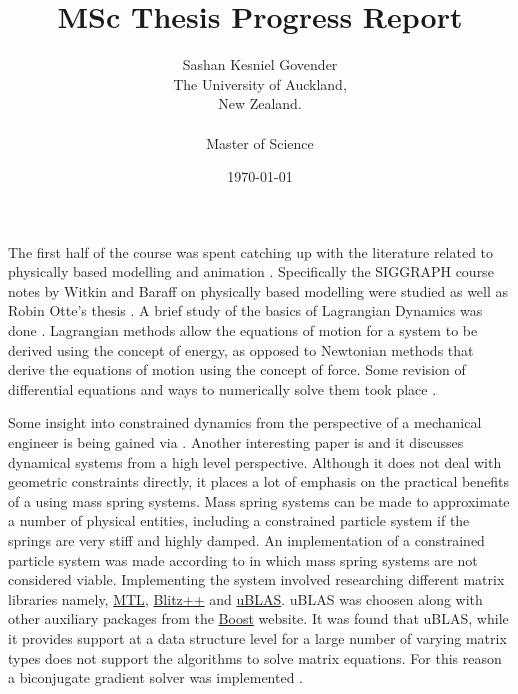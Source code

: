 \documentclass[12pt]{report}
\begin{document}
\title{MSc Thesis Progress Report}
\date{\today}
\author{Sashan Kesniel Govender\\
The University of Auckland, \\
New Zealand.\\
\\
Master of Science} 
\maketitle
\newpage
The first half of the course was spent catching up with the literature related
to physically based modelling and animation \cite{Bourg, BarzelBarr}.
Specifically the SIGGRAPH course notes \cite{PBMNotes} by Witkin and Baraff on
physically based modelling were studied as well as Robin Otte's thesis
\cite{Otte}. A brief study of the basics of Lagrangian Dynamics was done
\cite{GoldStein, Wells}. Lagrangian methods allow the equations of motion for a
system to be derived using the concept of energy, as opposed to Newtonian
methods that derive the equations of motion using the concept of force. Some
revision of differential equations and ways to numerically solve them took place
\cite{NagleSaff, Eberly, Lee}.   

Some insight into constrained dynamics from the perspective of a mechanical
engineer is being gained via \cite{ComputationalDynamics}. Another interesting
paper is \cite{PracticalDynamics} and it discusses dynamical systems from a high
level perspective. Although it does not deal with geometric constraints
directly, it places a lot of emphasis on the practical benefits of a using mass
spring systems. Mass spring systems can be made to approximate a number of
physical entities, including a constrained particle system if the springs are
very stiff and highly damped. An implementation of a constrained particle system
was made according to \cite{PBMNotes, Otte} in which mass spring systems are not
considered viable. Implementing the system involved researching different matrix
libraries namely, \href{http://www.osl.iu.edu/research/mtl/}{MTL},
\href{http://www.oonumerics.org/blitz/}{Blitz++} and
\href{http://www.boost.org/libs/numeric/ublas/doc/index.htm}{uBLAS}. uBLAS was
choosen along with other auxiliary packages from the
\href{http://www.boost.org}{Boost} website. It was found that uBLAS, while it
provides support at a data structure level for a large number of varying matrix
types does not support the algorithms to solve matrix equations. For this reason
a biconjugate gradient solver was implemented \cite{NumRecipes}.
\end{document}
